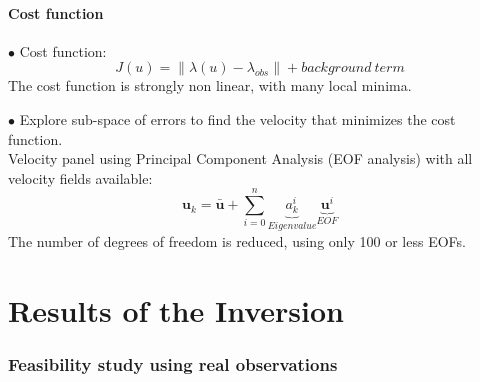 \documentclass[compress,slidescentered,notes=show]{beamer}
\begin{document}
	\subsection{Cost function}
\begin{frame}
  \begin{block}{}
    $\bullet$ Cost function:
    $$J(u)=\|\lambda(u)- \lambda_{obs}\| + background\ term $$
    The cost function is strongly non linear, with many local minima.\\
  \end{block}
  \vspace{0.6cm}
  \begin{block}{}
    $\bullet$ Explore sub-space of errors to find the velocity that minimizes the cost function. \\
    Velocity panel using Principal Component Analysis (EOF analysis) with all velocity fields available:
    $$\textbf{u}_k = \bar{\textbf{u}} + \sum_{i=0}^n{\underbrace{a_k^i}_{Eigenvalue}\underbrace{\textbf{u}^i}_{EOF_{}}}$$
    The number of degrees of freedom is reduced, using only 100 or less EOFs. \\
  \end{block}
  \vspace{0.2cm}

\end{frame}

\part{Results of the Inversion}

\begin{frame}
  \frametitle{\insertromanpartnumber \hspace{1em} \insertpart}
  \tableofcontents[hideotherpart]
\end{frame}

\section[Real data]{Feasibility study using real observations}
\end{document}
